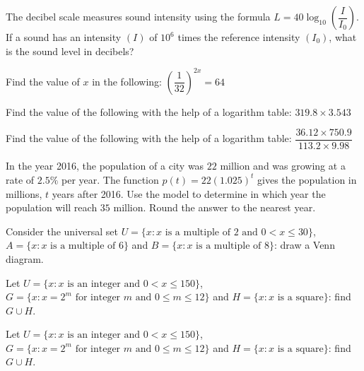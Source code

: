 \documentclass[11pt]{article}
\begin{document}
\begin{detq}
\item The decibel scale measures sound intensity using the formula $L=40\log_{10}\left(\dfrac{I}{I_0}\right)$. If a sound has an intensity $(I)$ of $10^6$ times the reference intensity $(I_0)$, what is the sound level in decibels?

\item Find the value of $x$ in the following: $\left(\dfrac{1}{32}\right)^{2x}=64$

\item Find the value of the following with the help of a logarithm table: $319.8\times3.543$

\item Find the value of the following with the help of a logarithm table: $\dfrac{36.12\times750.9}{113.2\times9.98}$

\item In the year 2016, the population of a city was $22$ million and was growing at a rate of $2.5\%$ per year. The function $p(t)=22(1.025)^t$ gives the population in millions, $t$ years after 2016. Use the model to determine in which year the population will reach $35$ million. Round the answer to the nearest year.

\item Consider the universal set $U=\{x: x \text{ is a multiple of } 2 \text{ and } 0<x\leq30\}$, $A=\{x: x \text{ is a multiple of } 6\}$ and $B=\{x: x \text{ is a multiple of } 8\}$: draw a Venn diagram.

\item Let $U=\{x: x \text{ is an integer and } 0<x\leq150\}$, $G=\{x: x=2^m \text{ for integer } m \text{ and } 0\leq m\leq12\}$ and $H=\{x: x \text{ is a square}\}$: find $G\cup H$.

\item Let $U=\{x: x \text{ is an integer and } 0<x\leq150\}$, $G=\{x: x=2^m \text{ for integer } m \text{ and } 0\leq m\leq12\}$ and $H=\{x: x \text{ is a square}\}$: find $G\cup H$.

\end{detq}
\end{document}
